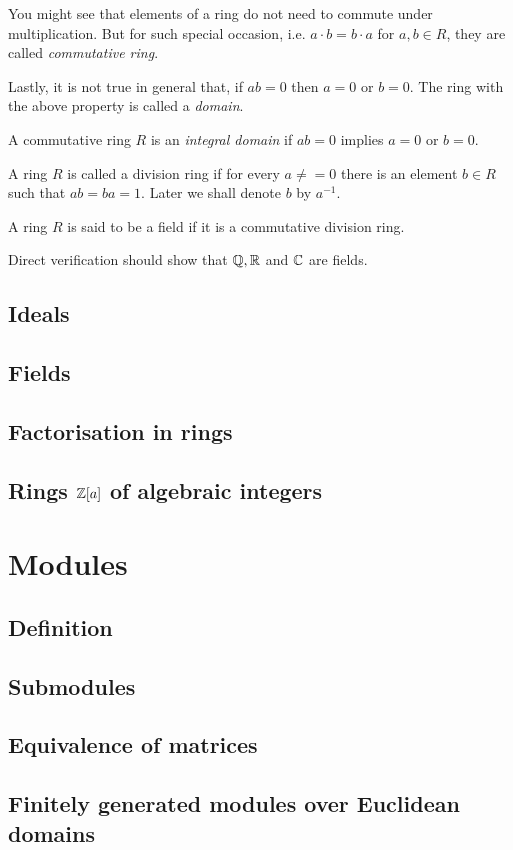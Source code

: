\documentclass[main.tex]{subfiles}
\begin{document}
			You might see that elements of a ring do not need to commute under multiplication. But for such special occasion, i.e. $a\cdot b = b \cdot a$ for $a, b\in R$, they are called \textit{commutative ring}.
			
			Lastly, it is not true in general that, if $ab = 0$ then $a = 0$ or $b = 0$. The ring with the above property is called a \textit{domain}.
			\begin{definition}
				A commutative ring $R$ is an \textit{integral domain} if $ab = 0$ implies $a = 0$ or $b = 0$.
			\end{definition}
			
			\begin{definition}
				A ring $R$ is called a division ring if for every $a \neq =0$ there is an element $b \in R$ such that $ab = ba = 1$. Later we shall denote $b$ by $a^{-1}$.
			\end{definition}
		
		\begin{definition}
			A ring $R$ is said to be a field if it is a commutative division ring.
		\end{definition}
			Direct verification should show that $\mathbb Q, \mathbb R$ and $\mathbb C$ are fields.
			\subsection{Ideals}
			
			\subsection{Fields}
			
			\subsection{Factorisation in rings}
			
			\subsection{Rings $\mathbb Z[a]$ of algebraic integers}
			
		\section{Modules}
			\subsection{Definition}
			
			\subsection{Submodules}
			
			\subsection{Equivalence of matrices}
			
			\subsection{Finitely generated modules over Euclidean domains}
\end{document}
